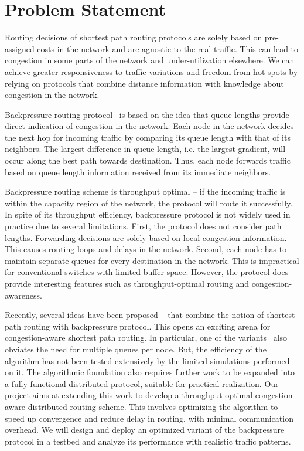 \label{sec:prob}


\section*{Problem Statement}

Routing decisions of shortest path routing protocols are solely based on pre-assigned costs in the network and are agnostic to the real traffic. This can lead to congestion in some parts of the network and under-utilization elsewhere. We can achieve greater responsiveness to traffic variations and freedom from hot-spots by relying on protocols that combine distance information with knowledge about congestion in the network. 

Backpressure routing protocol~\cite{BP-orig} is based on the idea that queue lengths provide direct indication of congestion in the network. Each node in the network decides the next hop for incoming traffic by comparing its queue length with that of its neighbors. The largest difference in queue length, i.e. the largest gradient, will occur along the best path towards destination. Thus, each node forwards traffic based on queue length information received from its immediate neighbors. 

Backpressure routing scheme is throughput optimal -- if the incoming traffic is within the capacity region of the network, the protocol will route it successfully. In spite of its throughput efficiency, backpressure protocol is not widely used in practice due to several limitations. First, the protocol does not consider path lengths. Forwarding decisions are solely based on local congestion information. This causes routing loops and delays in the network. Second, each node has to maintain separate queues for every destination in the network. This is impractical for conventional switches with limited buffer space. However, the protocol does provide interesting features such as throughput-optimal routing and congestion-awareness. 

Recently, several ideas have been proposed ~\cite{Srikant3, Austin1} that combine the notion of shortest path routing with backpressure protocol. This opens an exciting arena for congestion-aware shortest path routing. In particular, one of the variants~\cite{Srikant3} also obviates the need for multiple queues per node. But, the efficiency of the algorithm has not been tested extensively by the limited simulations performed on it. The algorithmic foundation also requires further work to be expanded into a fully-functional distributed protocol, suitable for practical realization. Our project aims at extending this work to develop a throughput-optimal congestion-aware distributed routing scheme. This involves optimizing the algorithm to speed up convergence and reduce delay in routing, with minimal communication overhead. We will design and deploy an optimized variant of the backpressure protocol in a testbed and analyze its performance with realistic traffic patterns.  

